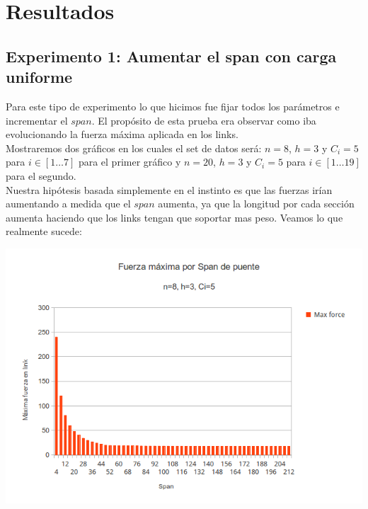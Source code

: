 \section{Resultados}

\subsection{Experimento 1: Aumentar el span con carga uniforme}

Para este tipo de experimento lo que hicimos fue fijar todos los parámetros e incrementar el $span$. El propósito de esta prueba era observar como iba evolucionando la fuerza máxima aplicada en los links.\\

Mostraremos dos gráficos en los cuales el set de datos será: $n = 8$, $h = 3$ y $C_i = 5$ para $i \in [1 \dots 7]$ para el primer gráfico y $n = 20$, $h = 3$ y $C_i = 5$ para $i \in [1 \dots 19]$ para el segundo.\\

Nuestra hipótesis basada simplemente en el instinto es que las fuerzas irían aumentando a medida que el $span$ aumenta, ya que la longitud por cada sección aumenta haciendo que los links tengan que soportar mas peso. Veamos lo que realmente sucede:

\begin{center}
\includegraphics[scale=0.8]{archivos/graficos/Fuerza-x-span.png}\\
\end{center}

